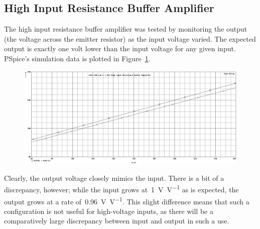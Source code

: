 \subsection{High Input Resistance Buffer Amplifier}
The high input resistance buffer amplifier was tested by monitoring the output
(the voltage across the emitter resistor) as the input voltage varied.  The
expected output is exactly one volt lower than the input voltage for any given
input.  PSpice's simulation data is plotted in Figure~\ref{fig:bjtPlotV}.
%
\begin{figure}[H]
	\centering
	\includegraphics[width=\pwidth]{img/plot/bjtPlotV.PNG}
	\parbox{\pwidth}{
	\caption{}
	\label{fig:bjtPlotV}}
\end{figure}
%
Clearly, the output voltage closely mimics the input.  There is a bit of a
discrepancy, however; while the input grows at~\SI{1}{\volt\per\volt} as is
expected, the output grows at a rate of~\SI{0.96}{\volt\per\volt}.  This slight
difference means that such a configuration is not useful for high-voltage
inputs, as there will be a comparatively large discrepancy between input and
output in such a use.

